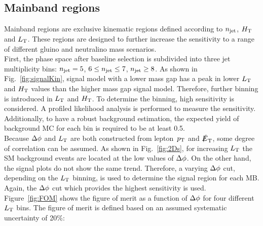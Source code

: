 \subsection{Mainband regions}
Mainband regions are exclusive kinematic regions defined according to $n_{\rm jet}$, $H_{\rm T}$ and $L_{\rm T}$. These regions are designed to further increase the sensitivity to a range of different gluino and neutralino mass scenarios.\\
First, the phase space after baseline selection is subdivided into three jet multiplicity bins: $n_{\rm jet}=5$, $6\leq n_{\rm jet}\leq7$, $n_{\rm jet}\geq8$. As shown in Fig.~\ref{fig:signalKin}, signal model with a lower mass gap has a peak in lower $L_{\rm T}$ and $H_{\rm T}$ values than the higher mass gap signal model. Therefore, further binning is introduced in $L_{\rm T}$ and $H_{\rm T}$. To determine the binning, high sensitivity is considered. A profiled likelihood analysis is performed to measure the sensitivity. Additionally, to have a robust background estimation, the expected yield of background MC for each bin is required to be at least 0.5.\\
Because $\Delta \phi$ and $L_{\rm T}$ are both constructed from lepton~$p_{\rm T}$ and $\slashed{E}_{\rm T}$, some degree of correlation can be assumed.
As shown in Fig.~\ref{fig:2Ds}, for increasing $L_{\rm T}$ the SM background events are located at the low values of $\Delta \phi$. On the other hand, the signal plots do not show the same trend. Therefore, a varying $\Delta \phi$  cut, depending on the $L_{\rm T}$ binning, is used to determine the signal region for each MB. Again, the $\Delta \phi$ cut which provides the highest sensitivity is used. Figure~\ref{fig:FOM} shows the figure of merit as a function of $\Delta \phi$ for four different $L_{\rm T}$ bins. The figure of merit is defined based on an assumed systematic uncertainty of 20\%:
